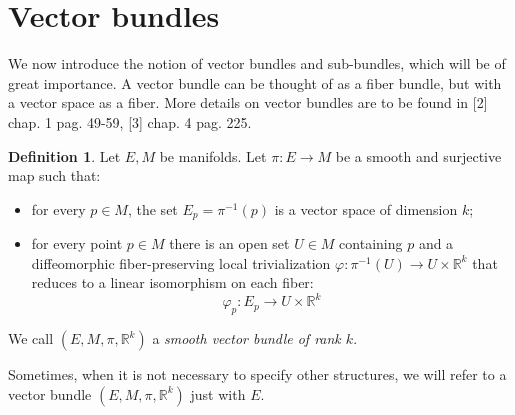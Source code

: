 \documentclass[12pt,a4paper]{report}
\theoremstyle{definition}
\newtheorem{Def}{Definition}[chapter]
\theoremstyle{Theorem}
\theoremstyle{definition}
\theoremstyle{definition}
\begin{document}
	\section{Vector bundles}
	We now introduce the notion of vector bundles and sub-bundles, which will be of great importance. A vector bundle can be thought of as a fiber bundle, but with a vector space as a fiber. More details on vector bundles are to be found in [2] chap. 1 pag. 49-59, [3] chap. 4 pag. 225.
	\begin{Def}\label{Def_5.2}
		Let $E,M$ be manifolds. Let $\pi:E\rightarrow M$ be a smooth and surjective map such that:
		\begin{itemize}
			\item for every $p\in M$, the set $E_p=\pi^{-1}(p)$ is a vector space of dimension $k$;
			\item for every point $p\in M$ there is an open set $U\in M$ containing $p$ and a diffeomorphic fiber-preserving local trivialization $\varphi:\pi^{-1}(U)\rightarrow U\times \mathbb{R}^k$ that reduces to a linear isomorphism on each fiber:
			$$\varphi_p:E_p\rightarrow U\times \mathbb{R}^k$$
		\end{itemize}
		We call $(E,M,\pi,\mathbb{R}^k)$ a \textit{smooth vector bundle of rank $k$}.
	\end{Def}
	Sometimes, when it is not necessary to specify other structures, we will refer to a vector bundle $(E,M,\pi,\mathbb{R}^k)$ just with $E$.
\end{document}
